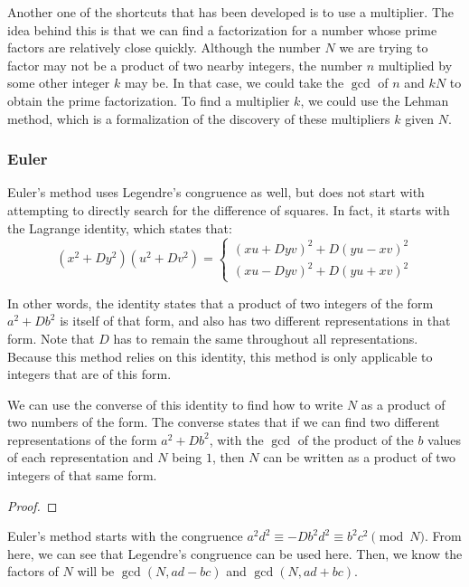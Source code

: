\documentclass{article}
\begin{document}
\par Another one of the shortcuts that has been developed is to use a multiplier. The idea behind this is that
we can find a factorization for a number whose prime factors are relatively close quickly. Although the number $N$ we
are trying to factor may not be a product of two nearby integers, the number $n$ multiplied by some other integer $k$
may be. In that case, we could take the $\gcd$ of $n$ and $kN$ to obtain the prime factorization. To find a multiplier
$k$, we could use the Lehman method, which is a formalization of the discovery of these multipliers $k$ given $N$.


\subsubsection*{Euler}
\par Euler's method uses Legendre's congruence as well, but does not start with attempting to directly search for the
difference of squares. In fact, it starts with the Lagrange identity, which states that:
$$(x^2+Dy^2)(u^2+Dv^2) = \begin{cases} (xu+Dyv)^2 + D(yu-xv)^2 \\
    (xu - Dyv)^2 + D(yu+xv)^2 \end{cases}$$

\par In other words, the identity states that a product of two integers of the form $a^2+Db^2$ is itself of that form,
and also has two different representations in that form. Note that $D$ has to remain the same throughout all representations.
Because this method relies on this identity, this method is only applicable to integers that are of this form.

\par We can use the converse of this identity to find how to write $N$ as a product of two numbers of the form. The converse
states that if we can find two different representations of the form $a^2+Db^2$, with the $\gcd$ of the product of the $b$
values of each representation and $N$ being $1$, then $N$ can be written as a product of two integers of that same form.

\begin{proof}
\end{proof}

\par Euler's method starts with the congruence $a^2d^2 \equiv -Db^2d^2 \equiv b^2c^2 \pmod{N}$. From here, we can see that
Legendre's congruence can be used here. Then, we know the factors of $N$ will be $\gcd(N, ad-bc)$ and $\gcd(N,ad+bc)$.
\end{document}
